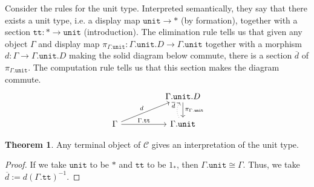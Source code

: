\documentclass{article}
\theoremstyle{definition}
\newtheorem{theorem}[definition]{Theorem}
\newcommand{\T}{\mathbb T}
\newcommand{\C}{\mathcal C}
\newcommand{\syncat}[1]{\C [#1]}
\begin{document}

Consider the rules for the unit type. Interpreted semantically, they say that there exists a unit type, i.e. a display map $\mathtt{unit} \to *$ (by formation), together with a section $\mathtt{tt} : * \to \mathtt{unit}$ (introduction). The elimination rule tells us that given any object $\Gamma$ and display map $\pi_{\Gamma.\mathtt{unit}}: \Gamma.\mathtt{unit}. D \to \Gamma.\mathtt{unit}$ together with a morphism $d : \Gamma \to \Gamma.\mathtt{unit}. D $ making the solid diagram below commute, there is a section $\overline d$ of $\pi_{\Gamma . \mathtt{unit}}$. The computation rule tells us that this section makes the diagram commute.
\[
     \begin{tikzcd}
         && \Gamma.\mathtt{unit}. D \ar[d,"\pi_{\Gamma.\mathtt{unit}}"] \\
         \Gamma \ar[rr,"\Gamma.\mathtt{tt}"] \ar[urr," d"] && \Gamma.\mathtt{unit} \ar[u,bend left,"\overline d",dotted]
     \end{tikzcd}
\]

\begin{theorem}
    Any terminal object of $\C$ gives an interpretation of the unit type.
\end{theorem}
\begin{proof}
    If we take $\mathtt {unit}$ to be $*$ and $\mathtt{tt}$ to be $1_*$, then $\Gamma.\mathtt {unit} \cong \Gamma$. Thus, we take $\overline d := d(\Gamma. \mathtt{tt})^{-1} $.
\end{proof}
\end{document}
